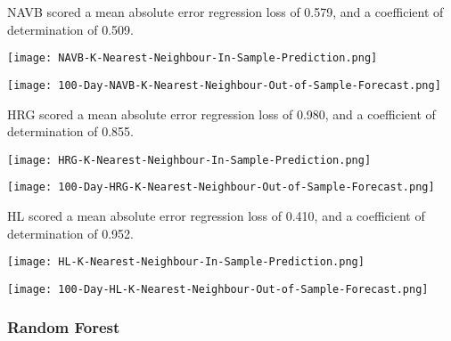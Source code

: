 NAVB scored a mean absolute error regression loss of 0.579, and a coefficient of determination of 0.509.

\begin{center}
    \texttt{[image: NAVB-K-Nearest-Neighbour-In-Sample-Prediction.png]}
    \label{fig:nonfloat}
\end{center}

\begin{center}  
    \texttt{[image: 100-Day-NAVB-K-Nearest-Neighbour-Out-of-Sample-Forecast.png]}
    \label{fig:nonfloat}
\end{center}

HRG scored a mean absolute error regression loss of 0.980, and a coefficient of determination of 0.855.

\begin{center}
    \texttt{[image: HRG-K-Nearest-Neighbour-In-Sample-Prediction.png]}
    \label{fig:nonfloat}
\end{center}

\begin{center}  
    \texttt{[image: 100-Day-HRG-K-Nearest-Neighbour-Out-of-Sample-Forecast.png]}
    \label{fig:nonfloat}
\end{center}

HL scored a mean absolute error regression loss of 0.410, and a coefficient of determination of 0.952.

\begin{center}
    \texttt{[image: HL-K-Nearest-Neighbour-In-Sample-Prediction.png]}
    \label{fig:nonfloat}
\end{center}

\begin{center}  
    \texttt{[image: 100-Day-HL-K-Nearest-Neighbour-Out-of-Sample-Forecast.png]}
    \label{fig:nonfloat}
\end{center}

\subsubsection{Random Forest}


